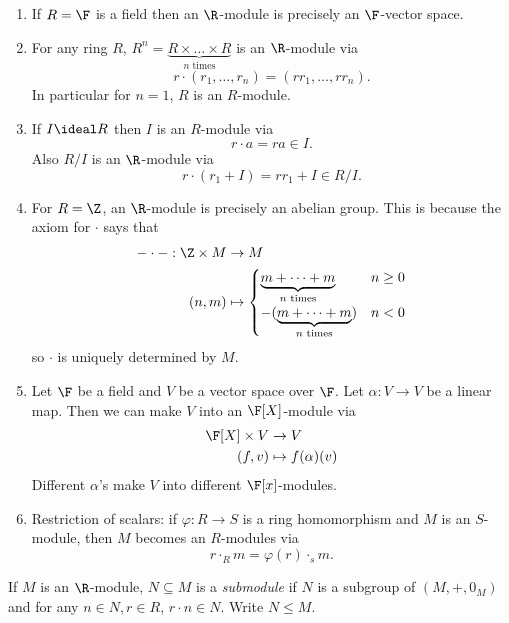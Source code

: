 \documentclass[a4paper]{article}
\theoremstyle{definition}
\begin{document}
\begin{eg}\leavevmode
  \begin{enumerate}
  \item If \(R = \F\) is a field then an \(\R\)-module is precisely an \(\F\)-vector space.
  \item For any ring \(R\), \(R^n = \underbrace{R \times \dots \times R}_{n \text{ times}}\) is an \(\R\)-module via
    \[
      r \cdot (r_1, \dots, r_n) = (rr_1, \dots, rr_n).
    \]
    In particular for \(n = 1\), \(R\) is an \(R\)-module.
  \item If \(I \ideal R\) then \(I\) is an \(R\)-module via
    \[
      r \cdot a = ra \in I.
    \]
    Also \(R/I\) is an \(\R\)-module via
    \[
      r \cdot (r_1 + I) = rr_1 + I \in R/I.
    \]
  \item For \(R = \Z\), an \(\R\)-module is precisely an abelian group. This is because the axiom for \(\cdot\) says that
    \begin{align*}
      - \cdot -: \Z \times M &\to M \\
      (n, m) &\mapsto
               \begin{cases}
                 \underbrace{m + \dots + m}_{n \text{ times}} & n \geq 0 \\
                 -(\underbrace{m + \dots + m}_{n \text{ times}}) & n < 0 \\
               \end{cases}
    \end{align*}
    so \(\cdot\) is uniquely determined by \(M\).
  \item Let \(\F\) be a field and \(V\) be a vector space over \(\F\). Let \(\alpha: V \to V\) be a linear map. Then we can make \(V\) into an \(\F[X]\)-module via
    \begin{align*}
      \F[X] \times V &\to V \\
      (f, v) &\mapsto f(\alpha)(v)
    \end{align*}
    Different \(\alpha\)'s make \(V\) into different \(\F[x]\)-modules.
  \item Restriction of scalars: if \(\varphi: R \to S\) is a ring homomorphism and \(M\) is an \(S\)-module, then \(M\) becomes an \(R\)-modules via
    \[
      r \cdot_R m = \varphi(r) \cdot_s m.
    \]
  \end{enumerate}
\end{eg}

\begin{definition}[Submodule]
  If \(M\) is an \(\R\)-module, \(N \subseteq M\) is a \emph{submodule} if \(N\) is a subgroup of \((M, +, 0_M)\) and for any \(n \in N, r \in R\), \(r \cdot n \in N\). Write \(N \leq M\).
\end{definition}
\end{document}
